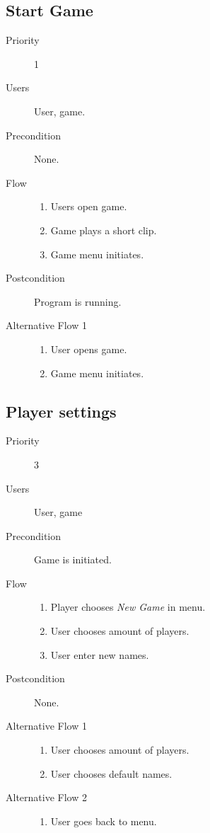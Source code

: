 \documentclass[12pt,a4paper]{article}
\begin{document}
\subsection{Start Game}
\begin{description}
\item[Priority] 1
\item[Users] User, game.
\item[Precondition] None.
\item[Flow]\mbox{}
  \begin{enumerate}
  \item Users open game.
  \item Game plays a short clip.
  \item Game menu initiates.
  \end{enumerate}
\item[Postcondition] Program is running.
\item[Alternative Flow 1]\mbox{}
  \begin{enumerate}
  \item User opens game.
  \item Game menu initiates.
  \end{enumerate}
\end{description}

\subsection{Player settings}
\begin{description}
\item[Priority] 3
\item[Users] User, game
\item[Precondition] Game is initiated.
\item[Flow]\mbox{}
  \begin{enumerate}
  \item Player chooses \emph{New Game} in menu.
  \item User chooses amount of players.
  \item User enter new names.
  \end{enumerate}
\item[Postcondition] None.
\item[Alternative Flow 1]\mbox{}
  \begin{enumerate}
  \item User chooses amount of players.
  \item User chooses default names.
  \end{enumerate}
\item[Alternative Flow 2]\mbox{}
  \begin{enumerate}
  \item User goes back to menu.
  \end{enumerate}
\end{description}
\end{document}
